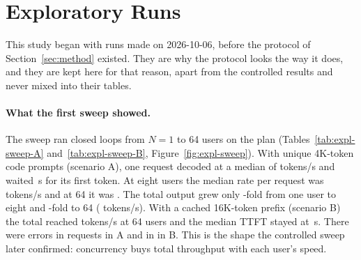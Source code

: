 \section{Exploratory Runs}\label{sec:results-exploratory}

This study began with runs made on 2026-10-06, before the protocol of Section~\ref{sec:method} existed. They are why
the protocol looks the way it does, and they are kept here for that reason, apart from the controlled results and
never mixed into their tables.

\noindent{}

\paragraph{What the first sweep showed.}
The sweep ran closed loops from $N=1$ to 64 users on the \texttt{} plan
(Tables~\ref{tab:expl-sweep-A} and~\ref{tab:expl-sweep-B}, Figure~\ref{fig:expl-sweep}). With unique 4K-token code
prompts (scenario A), one request decoded at a median of  tokens/s and waited
\,s for its first token. At eight users the median rate per request was
 tokens/s and at 64 it was . The total output grew only
-fold from one user to eight and -fold to 64
( tokens/s). With a cached 16K-token prefix (scenario B) the total reached
 tokens/s at 64 users and the median TTFT stayed at \,s.
There were  errors in  requests in A and  in
 in B. This is the shape the controlled sweep later confirmed: concurrency buys total
throughput with each user's speed.





